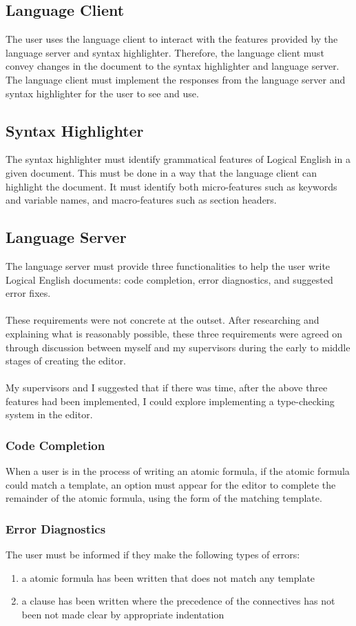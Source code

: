 \documentclass[../main.tex]{subfiles}
\begin{document}
\subsection{Language Client}
The user uses the language client to interact with the features provided by the language server and syntax highlighter. Therefore, the language client must convey changes in the document to the syntax highlighter and language server. The language client must implement the responses from the language server and syntax highlighter for the user to see and use.

\subsection{Syntax Highlighter}
The syntax highlighter must identify grammatical features of Logical English in a given document. This must be done in a way that the language client can highlight the document. It must identify both micro-features such as keywords and variable names, and macro-features such as section headers.

\subsection{Language Server}
The language server must provide three functionalities to help the user write Logical English documents: code completion, error diagnostics, and suggested error fixes. 
\\ 
\\
These requirements were not concrete at the outset. After researching and explaining what is reasonably possible, these three requirements were agreed on through discussion between myself and my supervisors during the early to middle stages of creating the editor. 
\\
\\
My supervisors and I suggested that if there was time, after the above three features had been implemented, I could explore implementing a type-checking system in the editor.

\subsubsection{Code Completion}
When a user is in the process of writing an atomic formula, if the atomic formula could match a template, an option must appear for the editor to complete the remainder of the atomic formula, using the form of the matching template.

\subsubsection{Error Diagnostics}
The user must be informed if they make the following types of errors:
\begin{enumerate}
    \item a atomic formula has been written that does not match any template 
    \item a clause has been written where the precedence of the connectives has not been not made clear by appropriate indentation
\end{enumerate}
\end{document}
